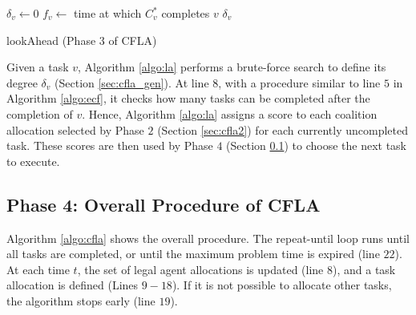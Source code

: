 \begin{algorithm}[t]
  \DontPrintSemicolon
  $\delta_v \gets 0$ \;
  $f_v \gets $ time at which $C^*_v$ completes $v$\;
  \Return $\delta_v$\;
  \caption{\textsf{lookAhead} (Phase $3$ of CFLA)\label{algo:la}}
\end{algorithm}

Given a task $v$, Algorithm \ref{algo:la} performs a brute-force search to define its
degree $\delta_v$ (Section \ref{sec:cfla_gen}). At line $8$, with a procedure similar to
line $5$ in Algorithm \ref{algo:ecf}, it checks how many tasks can be completed after the
completion of $v$.
Hence, Algorithm \ref{algo:la} assigns a score to each coalition allocation selected by
Phase $2$ (Section \ref{sec:cfla2}) for each currently uncompleted task. These scores are
then used by Phase $4$ (Section \ref{sec:cfla4}) to choose the next task to execute.

\subsection{Phase 4: Overall Procedure of CFLA}\label{sec:cfla4}

Algorithm \ref{algo:cfla} shows the overall procedure. The \textsf{repeat-until} loop runs
until all tasks are completed, or until the maximum problem time is expired (line $22$). At
each time $t$, the set of legal agent allocations is updated (line $8$), and a task
allocation is defined (Lines $9 - 18$). If it is not possible to allocate other tasks,
the algorithm stops early (line $19$).

